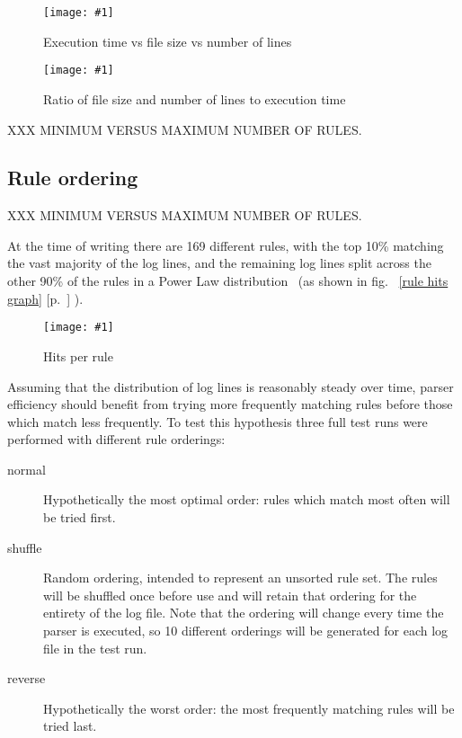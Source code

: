 \documentclass[draft]{svmult}
\newcommand{\showgraph}[3]{%
    \begin{figure}[hbt!]
        \caption{#2}\label{#3}
        \texttt{[image: \#1]}
    \end{figure}
}
\newcommand{\refwithpage}[1]{%
    \empty{}\ref{#1} [p.~\pageref{#1}]%
}
\newcommand{\numberOFrules}[0]{%
    169%
}
\begin{document}
\showgraph{build/plot-normal-filesize-numlines}{Execution time vs file
size vs number of lines}{execution time vs file size vs number of lines
graph}

\showgraph{build/plot-normal-filesize-numlines-factor}{Ratio of file
size and number of lines to execution time}{execution time vs file size vs
number lines factor}

XXX MINIMUM VERSUS MAXIMUM NUMBER OF RULES\@.

\subsection{Rule ordering}

\label{Rule ordering}
\label{rule ordering for efficiency}
\label{rule efficiency}

XXX MINIMUM VERSUS MAXIMUM NUMBER OF RULES\@.

At the time of writing there are \numberOFrules{} different rules, with the
top 10\% matching the vast majority of the log lines, and the remaining log
lines split across the other 90\% of the rules in a Power Law
distribution~\cite{powerlaw} (as shown in fig.~\refwithpage{rule hits
graph}).  \showgraph{build/plot-hits}{Hits per rule}{rule hits graph}
Assuming that the distribution of log lines is reasonably steady over time,
parser efficiency should benefit from trying more frequently matching rules
before those which match less frequently.  To test this hypothesis three
full test runs were performed with different rule orderings:

\begin{description}

    \item [normal]  Hypothetically the most optimal order: rules which
        match most often will be tried first.

    \item [shuffle] Random ordering, intended to represent an unsorted rule
        set.  The rules will be shuffled once before use and will retain
        that ordering for the entirety of the log file.  Note that the
        ordering will change every time the parser is executed, so 10
        different orderings will be generated for each log file in the test
        run.

    \item [reverse] Hypothetically the worst order: the most frequently
        matching rules will be tried last.

\end{description}
\end{document}
